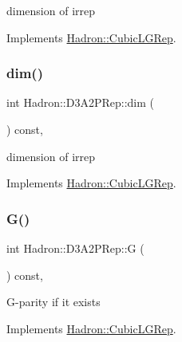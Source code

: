dimension of irrep 

Implements \mbox{\hyperlink{structHadron_1_1CubicLGRep_a3acbaea26503ed64f20df693a48e4cdd}{Hadron\+::\+Cubic\+L\+G\+Rep}}.

\mbox{\label{structHadron_1_1D3A2PRep_a0cd24db04dc4889f2a1014f97efb41fc}} 
\subsubsection{\texorpdfstring{dim()}{dim()}\hspace{0.1cm}{\footnotesize\ttfamily [3/3]}}
{\footnotesize\ttfamily int Hadron\+::\+D3\+A2\+P\+Rep\+::dim (\begin{DoxyParamCaption}{ }\end{DoxyParamCaption}) const\hspace{0.3cm}{\ttfamily [inline]}, {\ttfamily [virtual]}}

dimension of irrep 

Implements \mbox{\hyperlink{structHadron_1_1CubicLGRep_a3acbaea26503ed64f20df693a48e4cdd}{Hadron\+::\+Cubic\+L\+G\+Rep}}.

\mbox{\label{structHadron_1_1D3A2PRep_a66a258648b3e253504417736d0c454a8}} 
\subsubsection{\texorpdfstring{G()}{G()}\hspace{0.1cm}{\footnotesize\ttfamily [1/3]}}
{\footnotesize\ttfamily int Hadron\+::\+D3\+A2\+P\+Rep\+::G (\begin{DoxyParamCaption}{ }\end{DoxyParamCaption}) const\hspace{0.3cm}{\ttfamily [inline]}, {\ttfamily [virtual]}}

G-\/parity if it exists 

Implements \mbox{\hyperlink{structHadron_1_1CubicLGRep_ace26f7b2d55e3a668a14cb9026da5231}{Hadron\+::\+Cubic\+L\+G\+Rep}}.

\mbox{\label{structHadron_1_1D3A2PRep_a66a258648b3e253504417736d0c454a8}} 

